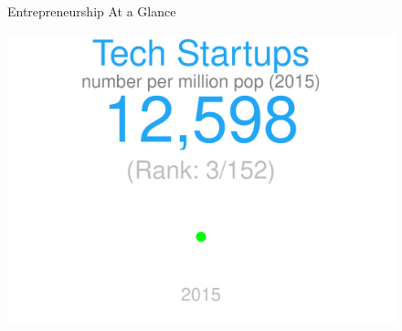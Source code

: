 \documentclass{article}\usepackage[]{graphicx}\usepackage[]{color}
\makeatletter
\def\maxwidth{ %
  \ifdim\Gin@nat@width>\linewidth
    \linewidth
  \else
    \Gin@nat@width
  \fi
}
\makeatother
\begin{document}
\begin{figure}
\begin{minipage}[t]{0.99\textwidth} %
  \vspace*{-26.8cm}
  \begin{minipage}[t]{0.54\textwidth} %
    \vspace{-1ex}
    \begin{minipage}[t]{0.99\textwidth} %
      \hspace{5ex}\raggedright\Large{\color{white}Entrepreneurship At a Glance}
    \end{minipage}
  
    \begin{minipage}[b]{0.99\textwidth} 
      \vspace{4ex}
    \end{minipage}
  \end{minipage}
  \begin{minipage}[t]{0.50\textwidth} %
    \vspace{-4ex}
    \begin{minipage}[c]{0.29\textwidth}


\hfill{}\includegraphics[width=\maxwidth]{figure/figure_sparkline1-1} 




\end{minipage}
\end{minipage}
\end{minipage}
\end{figure}
\end{document}
